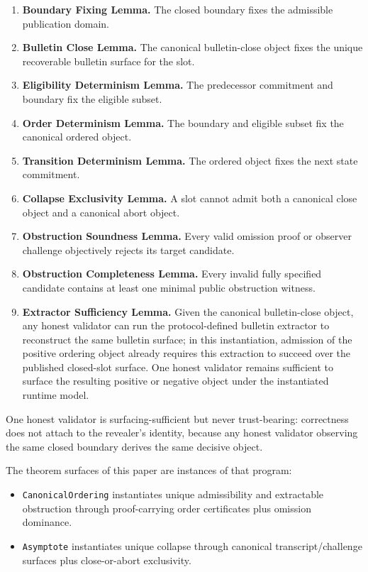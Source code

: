 \documentclass[11pt]{article}
\newcommand{\code}[1]{\texttt{#1}}
\begin{document}
\begin{enumerate}[leftmargin=1.5em]
\item \textbf{Boundary Fixing Lemma.} The closed boundary fixes the admissible
publication domain.
\item \textbf{Bulletin Close Lemma.} The canonical bulletin-close object fixes
the unique recoverable bulletin surface for the slot.
\item \textbf{Eligibility Determinism Lemma.} The predecessor commitment and
boundary fix the eligible subset.
\item \textbf{Order Determinism Lemma.} The boundary and eligible subset fix
the canonical ordered object.
\item \textbf{Transition Determinism Lemma.} The ordered object fixes the next
state commitment.
\item \textbf{Collapse Exclusivity Lemma.} A slot cannot admit both a canonical
close object and a canonical abort object.
\item \textbf{Obstruction Soundness Lemma.} Every valid omission proof or
observer challenge objectively rejects its target candidate.
\item \textbf{Obstruction Completeness Lemma.} Every invalid fully specified
candidate contains at least one minimal public obstruction witness.
\item \textbf{Extractor Sufficiency Lemma.} Given the canonical bulletin-close
object, any honest validator can run the protocol-defined bulletin extractor to
reconstruct the same bulletin surface; in this instantiation, admission
of the positive ordering object already requires this extraction to succeed
over the published closed-slot surface. One honest validator remains sufficient
to surface the resulting positive or negative object under the instantiated runtime
model.
\end{enumerate}

One honest validator is surfacing-sufficient but never trust-bearing:
correctness does not attach to the revealer's identity, because any honest
validator observing the same closed boundary derives the same decisive object.

The theorem surfaces of this paper are instances of that program:

\begin{itemize}[leftmargin=1.5em]
\item \code{CanonicalOrdering} instantiates unique admissibility and
extractable obstruction through proof-carrying order certificates plus omission
dominance.
\item \code{Asymptote} instantiates unique collapse through canonical
transcript/challenge surfaces plus close-or-abort exclusivity.
\end{itemize}
\end{document}
